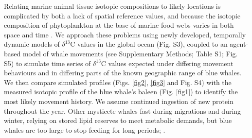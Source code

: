 \documentclass[a4paper,12pt]{article}
\begin{document}

Relating marine animal tissue isotopic compositions to likely locations is complicated by both a lack of spatial reference values, and because the isotopic composition of phytoplankton at the base of marine food webs varies in both space and time \cite{west2006stable,mcmahon2015millennial}.
We approach these problems using newly developed, temporally dynamic models of $\delta^{13}$C values in the global ocean\cite{magozzi2017using} (Fig. S3), coupled to an agent-based model of whale movements (see Supplementary Methods; Table S1; Fig. S5) to simulate time series of $\delta^{13}$C values expected under differing movement behaviours and in differing parts of the known geographic range of blue whales. 
We then compare simulated profiles (Figs. \ref{fig2}, \ref{fig3} and Fig. S4) with the measured isotopic profile of the blue whale's baleen (Fig. \ref{fig1}) to identify the most likely movement history.
We assume continued ingestion of new protein throughout the year. 
Other mysticete whales fast during migrations and during winter, relying on stored lipid reserves to meet metabolic demands, but blue whales are too large to stop feeding for long periods; \cite{busquets2017estimating,silva2013north}.



\end{document}

